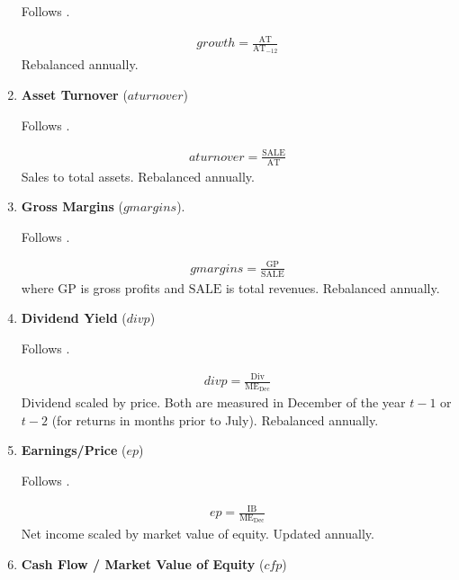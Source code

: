 \begin{enumerate}
	Follows . 
	
	\begin{align*}
		growth = \frac{ \mathrm{AT} }{ \mathrm{AT}_{-12} }
	\end{align*}	
	Rebalanced annually.
	
	\item \textbf{Asset Turnover} ($aturnover$) 
	
	Follows .
	
	\begin{align*}
		aturnover = \frac{ \mathrm{SALE} }{ \mathrm{AT} }
	\end{align*}	
	Sales to total assets. Rebalanced annually.
	
	
	
	\item \textbf{Gross Margins} ($gmargins$). 
	
	Follows .
	
	\begin{align*}
		gmargins = \frac{ \mathrm{GP} }{ \mathrm{SALE} }
	\end{align*}
	where $\mathrm{GP}$ is gross profits and $\mathrm{SALE}$ is total revenues. Rebalanced annually.
	 
	 
	 
	\item \textbf{Dividend Yield} ($divp$) 
	
	Follows . 
	
	\begin{align*}
		divp = \frac{ \mathrm{Div} }{ \mathrm{ME}_{\text{Dec}} }
	\end{align*}
	Dividend scaled by price. Both are measured in December of the year $t-1$ or $t-2$ (for returns in months prior to July). Rebalanced annually.
	
	
	
	\item \textbf{Earnings/Price} ($ep$)
	
	Follows .
	
	\begin{align*}
		ep = \frac{ \mathrm{IB} }{ \mathrm{ME}_{\text{Dec}} }
	\end{align*}
	Net income scaled by market value of equity. Updated annually.
	
	
	
	\item \textbf{Cash Flow / Market Value of Equity} ($cfp$) 
	

\end{enumerate}
